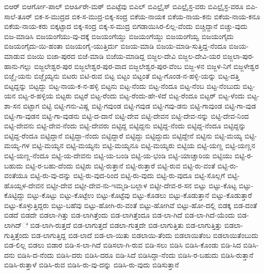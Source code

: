 ಬಿಆರ್
ಬಿಆರ್ಗೋ-ಪಾಲ್
ಬಿಆರ್ಹಿರೇ-ಮಠ್
ಬಿಎಟ್ಟೆವು
ಬಿಎಲ್
ಬಿಎಲ್ರೈಸ್
ಬಿಎಲ್ರೈಸ್ರ-ವರು
ಬಿಎಲ್ರೈಸ್ರ-ವರೂ
ಬಿಎ-ಸಾಲೆ-ತೂರ್
ಬಿಕ-ಸ-ಮುದ್ರದ
ಬಿಕ-ಸ-ಮುದ್ರ-ಬಿಕ್ಕ-ಸಂದ್ರ
ಬಿಕೆಯ-ನಾಯಕ
ಬಿಕೆಯ-ನಾಯ-ಕನು
ಬಿಕೆಯ-ನಾಯ-ಕನೂ
ಬಿಕೆಯ-ನಾಯ-ಕರು
ಬಿಕ್ಕಟ್ಟಾದ
ಬಿಕ್ಕ-ಸಂದ್ರ
ಬಿಕ್ಕ-ಸ-ಮುದ್ರ
ಬಿಗಡಾಯಿಸಿರ-ಲಿಲ್ಲ-ವೆಂದು
ಬಿಚ್ಚಿದ್ದಾನೆ
ಬಿಚ್ಚು-ವುದು
ಬಿಜ-ಮಾಡಿಸಿ
ಬಿಜಯಂಗೆಯು-ವು-ದಕ್ಕೆ
ಬಿಜಯಂಗೆಯ್ಡು
ಬಿಜಯಂಗೆಯ್ದು
ಬಿಜಯಂಗೆಯ್ವ
ಬಿಜಯಂಗೈದು
ಬಿಜಯಂಗೈದು-ಯಿ-ಹಂತಾ
ಬಿಜಯಂಗೈ-ಯುತ್ತಿರ್ದು
ಬಿಜಯ-ಮಾಡಿ
ಬಿಜಯ-ಮಾಡಿ-ಸುತ್ತಿದ್ದ-ನೆಂದೂ
ಬಿಜಯ-ಮಾಡುವ
ಬಿಜಯಿ
ಬಿಜಾ-ಪುರದ
ಬಿಜೆ-ಮಾಡಿ
ಬಿಜೆಯ-ಮಾಡಿದ್ದ
ಬಿಜ್ಜಲ-ದೇವಿ
ಬಿಜ್ಜಲ-ದೇವಿ-ಯರ
ಬಿಜ್ಜಲಾ-ಪುರ-ಹಾನು-ಗಲ್ಲು
ಬಿಜ್ಜಲೇಶ್ವರ-ಪುರ
ಬಿಜ್ಜಲೇಶ್ವರ-ಪುರ-ವಾದ
ಬಿಜ್ಜಲೇಶ್ವರ-ಪುರ-ವೆಂಬ
ಬಿಜ್ಜ-ಳನ
ಬಿಜ್ಜಳ-ನಿಗೆ
ಬಿಜ್ಜಳೇಶ್ವರ
ಬಿಜ್ಜೈ-ಯನು
ಬಿಜ್ಜೈಯ್ಯನು
ಬಿಟರು
ಬಿಟಿ-ರುವ
ಬಿಟ್ಟ
ಬಿಟ್ಟಂ
ಬಿಟ್ಟಂತೆ
ಬಿಟ್ಟ-ಗೊಂಡ-ನ-ಹಳ್ಳಿ-ಯನ್ನು
ಬಿಟ್ಟ-ದತ್ತಿ
ಬಿಟ್ಟದ್ದನ್ನು
ಬಿಟ್ಟದ್ದು
ಬಿಟ್ಟ-ನಾಯ-ಕ-ನ-ಹಳ್ಳಿ
ಬಿಟ್ಟನು
ಬಿಟ್ಟ-ನೆಂದು
ಬಿಟ್ಟ-ನೆಂದೂ
ಬಿಟ್ಟ-ನೆಂಬ
ಬಿಟ್ಟ-ನೆಂಬುದು
ಬಿಟ್ಟ-ಯನ
ಬಿಟ್ಟ-ರ-ಹಳ್ಳಿಯ
ಬಿಟ್ಟರು
ಬಿಟ್ಟರೆ
ಬಿಟ್ಟ-ರೆಂದು
ಬಿಟ್ಟ-ರೆಂದು-ಹೇ-ಳಿದೆ
ಬಿಟ್ಟ-ರೆಂದೂ
ಬಿಟ್ಟರ್
ಬಿಟ್ಟ-ಳೆಂದು
ಬಿಟ್ಟ-ಶಾ-ಸನ
ಬಿಟ್ಟಾಗ
ಬಿಟ್ಟಿ
ಬಿಟ್ಟಿ-ಗನು-ವಿಷ್ಣ
ಬಿಟ್ಟಿ-ಗವುಂಡ
ಬಿಟ್ಟಿ-ಗವುಡ
ಬಿಟ್ಟಿ-ಗವು-ಡನು
ಬಿಟ್ಟಿ-ಗಾವುಂಡ
ಬಿಟ್ಟಿ-ಗಾ-ವುಡ
ಬಿಟ್ಟಿ-ಗಾ-ವುಡನ
ಬಿಟ್ಟಿ-ಗಾ-ವುಡನು
ಬಿಟ್ಟಿ-ದ-ದಾನೆ
ಬಿಟ್ಟಿ-ದೇವ
ಬಿಟ್ಟಿ-ದೇವನ
ಬಿಟ್ಟಿ-ದೇವ-ನನ್ನು
ಬಿಟ್ಟಿ-ದೇವ-ನಿಂದ
ಬಿಟ್ಟಿ-ದೇವನು
ಬಿಟ್ಟಿ-ದೇವ-ನೆಂದು
ಬಿಟ್ಟಿ-ದೇವರು
ಬಿಟ್ಟಿದ್ದ
ಬಿಟ್ಟಿದ್ದನು
ಬಿಟ್ಟಿದ್ದ-ನೆಂದು
ಬಿಟ್ಟಿದ್ದ-ನೆಂದೂ
ಬಿಟ್ಟಿದ್ದನ್ನು
ಬಿಟ್ಟಿದ್ದ-ರೆಂದೂ
ಬಿಟ್ಟಿದ್ದಾನೆ
ಬಿಟ್ಟಿದ್ದಾ-ನೆಂದು
ಬಿಟ್ಟಿದ್ದಾರೆ
ಬಿಟ್ಟಿದ್ದು
ಬಿಟ್ಟಿದ್ದುದು
ಬಿಟ್ಟಿದ್ದೇನೆ
ಬಿಟ್ಟಿನು
ಬಿಟ್ಟಿ-ಮಯ್ಯ
ಬಿಟ್ಟಿ-ಮಯ್ಯ-ಗಳ
ಬಿಟ್ಟಿ-ಮಯ್ಯನ
ಬಿಟ್ಟಿ-ಮಯ್ಯನು
ಬಿಟ್ಟಿ-ಮಯ್ಯನೂ
ಬಿಟ್ಟಿ-ಮಯ್ಯರು
ಬಿಟ್ಟಿಯ
ಬಿಟ್ಟಿ-ಯಣ್ಣ
ಬಿಟ್ಟಿ-ಯಣ್ಣನ
ಬಿಟ್ಟಿ-ಯಣ್ಣ-ನೆಂದೂ
ಬಿಟ್ಟಿ-ಯ-ದೇವನು
ಬಿಟ್ಟಿ-ಯ-ಬಂಡಿ
ಬಿಟ್ಟಿ-ಯ-ಭಂಡಿ
ಬಿಟ್ಟಿ-ಯಾಚ್ಚಾರಿಯ
ಬಿಟ್ಟಿಯು
ಬಿಟ್ಟಿ-ರ-ಬಹುದು
ಬಿಟ್ಟಿ-ರ-ಬಹು-ದೆಂದು
ಬಿಟ್ಟಿರು
ಬಿಟ್ಟಿ-ರುತ್ತಾನೆ
ಬಿಟ್ಟಿ-ರುತ್ತಾರೆ
ಬಿಟ್ಟಿ-ರುವ
ಬಿಟ್ಟಿ-ರು-ವಂತೆ
ಬಿಟ್ಟಿ-ರು-ವಂತೆಯೂ
ಬಿಟ್ಟಿ-ರು-ವು-ದನ್ನು
ಬಿಟ್ಟಿ-ರು-ವುದ-ರಿಂದ
ಬಿಟ್ಟಿ-ರು-ವುದು
ಬಿಟ್ಟಿ-ರು-ವುದೂ
ಬಿಟ್ಟಿ-ಸೊಲ್ಲಗೆ
ಬಿಟ್ಟಿ-ಹೊಯ್ಸಳ-ದೇವನ
ಬಿಟ್ಟೀ-ದೇವ
ಬಿಟ್ಟೀ-ದೇವ-ನು-ಇಮ್ಮಡಿ-ಬಲ್ಲಾಳ
ಬಿಟ್ಟೀ-ದೇವ-ರ-ಸನ
ಬಿಟ್ಟು
ಬಿಟ್ಟು-ಕೊಟ್ಟ
ಬಿಟ್ಟು-ಕೊಟ್ಟಿದ್ದು
ಬಿಟ್ಟು-ಕೊಟ್ಟು
ಬಿಟ್ಟು-ಕೊಟ್ಟೆಉ
ಬಿಟ್ಟು-ಕೊಟ್ಟೆವು
ಬಿಟ್ಟು-ಕೊಡಲು
ಬಿಟ್ಟು-ಕೊಡುತ್ತಾನೆ
ಬಿಟ್ಟು-ಕೊಡುತ್ತಾರೆ
ಬಿಟ್ಟು-ಕೊಳ್ಳುತ್ತಿದ್ದರು
ಬಿಟ್ಟು-ಬಹೆವು
ಬಿಟ್ಟು-ಹೋಗಿ-ರು-ವಂತೆ
ಬಿಟ್ಟು-ಹೋಗಿವೆ
ಬಿಟ್ಟು-ಹೋ-ದಲ್ಲಿ
ಬಿಡಕ್ಕ
ಬಿಡ-ದಂತೆ
ಬಿಡದೆ
ಬಿಡದೇ
ಬಿಡಲಾ-ಗಿತ್ತು
ಬಿಡ-ಲಾಗಿತ್ತೆಂದು
ಬಿಡ-ಲಾಗಿತ್ತೆಂದೂ
ಬಿಡ-ಲಾ-ಗಿದೆ
ಬಿಡ-ಲಾ-ಗಿದೆ-ಯೆಂದು
ಬಿಡ-ಲಾಗಿದ್ೆ
ಬಿಡ-ಲಾಗಿ-ರುತ್ತದೆ
ಬಿಡ-ಲಾಗುತ್ತದೆ
ಬಿಡಲಾ-ಗುತ್ತದೇ
ಬಿಡ-ಲಾಗುತ್ತಿತು
ಬಿಡ-ಲಾಗುತ್ತಿತ್ತು
ಬಿಡಲಾ-ಗುತ್ತಿತ್ತೆಂದು
ಬಿಡ-ಲಾಗುತ್ತಿದ್ದ
ಬಿಡ-ಲಾದೆ
ಬಿಡ-ಲಾ-ಯಿತು
ಬಿಡಲಾಯಿ-ತೆಂದು
ಬಿಡಲಾಯಿತೆಂಬ
ಬಿಡಲಾಯಿತೆಂಬುದು
ಬಿಡ-ಲಿಲ್ಲ
ಬಿಡಲು
ಬಿಡಾರ
ಬಿಡಿ-ಸ-ಲಾ-ಗಿದೆ
ಬಿಡಿಸಲಾ-ಗಿ-ರುವ
ಬಿಡಿ-ಸಲು
ಬಿಡಿಸಿ
ಬಿಡಿಸಿ-ಕೊಂಡು
ಬಿಡಿ-ಸಿದ
ಬಿಡಿಸಿ-ದನು
ಬಿಡಿಸಿ-ದ-ನೆಂದು
ಬಿಡಿಸಿ-ದರು
ಬಿಡಿಸಿ-ದರೂ
ಬಿಡಿ-ಸಿದೆ
ಬಿಡಿಸಿದ್ದಾ-ನೆಂದು
ಬಿಡಿಸಿ-ರ-ಬಹುದು
ಬಿಡಿಸಿ-ರುತ್ತಾನೆ
ಬಿಡಿಸಿ-ರುತ್ತಾಳೆ
ಬಿಡಿಸಿ-ರುವ
ಬಿಡಿಸಿ-ರು-ವು-ದನ್ನು
ಬಿಡಿಸಿ-ರು-ವುದು
ಬಿಡಿಸುತ್ತಾನೆ
